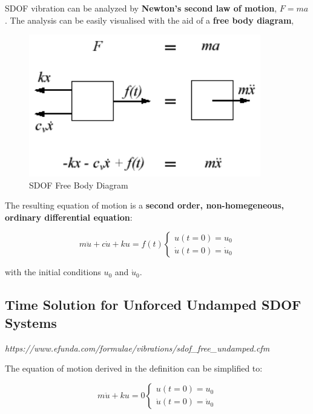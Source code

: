 \documentclass[10pt,b5paper,titlepage]{book}
\begin{document}
SDOF vibration can be analyzed by \textbf{Newton's second law of motion},
$ F = m a $. The analysis can be easily visualised with the aid of a
\textbf{free body diagram},

\begin{figure}[ht]
    \centering
    \includegraphics[width=0.90\textwidth]{img/SDOF_FreeBodyDiagram.png}
    \caption{SDOF Free Body Diagram}
    \label{fig:SDOF-freebodydiagram-png}
\end{figure}

The resulting equation of motion is a
\textbf{second order, non-homegeneous, ordinary differential equation}:

\begin{equation}
    m \ddot{u} + c \dot{u} + k u = f(t)
        \left\{ \begin{matrix}
                u(t=0) = u_0\\
                \dot{u}(t=0) = \dot{u}_0
          \end{matrix} \right.
\end{equation}

with the initial conditions $ u_0 $ and $ \dot{u}_0 $.


\subsection{Time Solution for Unforced Undamped SDOF Systems}

\textit{https://www.efunda.com/formulae/vibrations/sdof\_free\_undamped.cfm}

The equation of motion derived in the definition can be simplified to:

\begin{equation}
    m \ddot{u} + k u = 0
        \left\{ \begin{matrix}
                u(t=0) = u_0\\
                \dot{u}(t=0) = \dot{u}_0
          \end{matrix} \right.
\end{equation}
\end{document}
